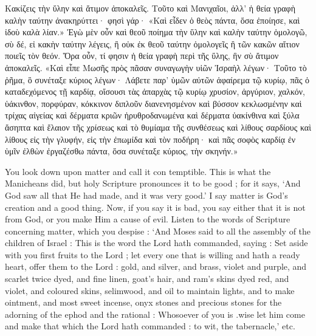 \documentclass[10pt]{book}
\newcommand{\switchGreek}[1][]{\selectlanguage{polutonikogreek} \switchcolumn*[#1]}
\newcommand{\switchEnglish}{\selectlanguage{english} \switchcolumn}
\begin{document}
\begin{paracol}{2}
Κακίζεις τὴν ὕλην καὶ ἄτιμον ἀποκαλεῖς. Τοῦτο καὶ Μανιχαῖοι, ἀλλ’ ἡ θεία
γραφὴ καλὴν ταύτην ἀνακηρύττει· φησὶ γάρ· «Καὶ εἶδεν ὁ θεὸς πάντα, ὅσα
ἐποίησε, καὶ ἰδοὺ καλὰ λίαν.» Ἐγὼ μὲν οὖν καὶ θεοῦ ποίημα τὴν ὕλην καὶ
καλὴν ταύτην ὁμολογῶ, σὺ δέ, εἰ κακὴν ταύτην λέγεις, ἢ οὐκ ἐκ θεοῦ ταύτην
ὁμολογεῖς ἢ τῶν κακῶν αἴτιον ποιεῖς τὸν θεόν. Ὅρα οὖν, τί φησιν ἡ θεία
γραφὴ περὶ τῆς ὕλης, ἣν σὺ ἄτιμον ἀποκαλεῖς. «Καὶ εἶπε Μωσῆς πρὸς πᾶσαν
συναγωγὴν υἱῶν Ἰσραὴλ λέγων· Τοῦτο τὸ ῥῆμα, ὃ συνέταξε κύριος λέγων· Λάβετε
παρ’ ὑμῶν αὐτῶν ἀφαίρεμα τῷ κυρίῳ, πᾶς ὁ καταδεχόμενος τῇ καρδίᾳ, οἴσουσι
τὰς ἀπαρχὰς τῷ κυρίῳ χρυσίον, ἀργύριον, χαλκόν, ὑάκινθον, πορφύραν,
κόκκινον διπλοῦν διανενησμένον καὶ βύσσον κεκλωσμένην καὶ τρίχας αἰγείας
καὶ δέρματα κριῶν ἠρυθροδανωμένα καὶ δέρματα ὑακίνθινα καὶ ξύλα ἄσηπτα καὶ
ἔλαιον τῆς χρίσεως καὶ τὸ θυμίαμα τῆς συνθέσεως καὶ λίθους σαρδίους καὶ
λίθους εἰς τὴν γλυφήν, εἰς τὴν ἐπωμίδα καὶ τὸν ποδήρη· καὶ πᾶς σοφὸς καρδίᾳ
ἐν ὑμῖν ἐλθὼν ἐργαζέσθω πάντα, ὅσα συνέταξε κύριος, τὴν σκηνήν.»

\switchEnglish

You look down upon matter and call it con 
temptible. This is what the Manicheans did, 
but holy Scripture pronounces it to be good ; 
for it says, `And God saw all that He had 
made, and it was very good.' I say matter is 
God's creation and a good thing. Now, if you 
say it is bad, you say either that it is not from 
God, or you make Him a cause of evil. Listen 
to the words of Scripture concerning matter, 
which you despise : `And Moses said to all the 
assembly of the children of Israel : This is 
the word the Lord hath commanded, saying : 
Set aside with you first fruits to the Lord ; 
let every one that is willing and hath a ready 
heart, offer them to the Lord : gold, and silver, 
and brass, violet and purple, and scarlet twice 
dyed, and fine linen, goat's hair, and ram's 
skins dyed red, and violet, and coloured skins, 
selimwood, and oil to maintain lights, and to 
make ointment, and most sweet incense, onyx 
stones and precious stones for the adorning of 
the ephod and the rational : Whosoever of you is 
.wise let him come and make that which the Lord 
hath commanded : to wit, the tabernacle,' etc. 

\switchGreek


\end{paracol}
\end{document}
